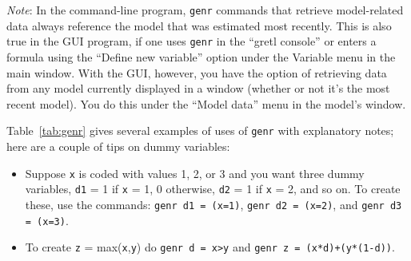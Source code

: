 \documentclass{article}
\begin{document}
{\begin{itemize}
\end{itemize}

\textit{Note}: In the command-line program, \texttt{genr} commands
that retrieve model-related data always reference the model that was
estimated most recently.  This is also true in the GUI program, if one
uses \texttt{genr} in the ``gretl console'' or enters a formula using
the ``Define new variable'' option under the Variable menu in the main
window.  With the GUI, however, you have the option of retrieving data
from any model currently displayed in a window (whether or not it's
the most recent model).  You do this under the ``Model data'' menu 
in the model's window.

Table~\ref{tab:genr} gives several examples of uses of \texttt{genr}
with explanatory notes; here are a couple of tips on dummy variables:

\begin{itemize}
\item Suppose \texttt{x} is coded with values 1, 2, or 3 and you want
  three dummy variables, \texttt{d1} = 1 if \texttt{x} = 1, 0
  otherwise, \texttt{d2} = 1 if \texttt{x} = 2, and so on.  To create
  these, use the commands: \texttt{genr d1 = (x=1)}, \texttt{genr d2 =
    (x=2)}, and \texttt{genr d3 = (x=3)}.
\item To create \texttt{z} = max(\texttt{x},\texttt{y}) do  
   \verb+genr d = x>y+  and \verb`genr z = (x*d)+(y*(1-d))`.
\end{itemize}


}
\end{document}

